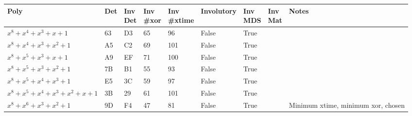 \begin{footnotesize}
\begin{longtable}{|l|l|l|l|l|l|l|l|l|}
\hline
\textbf{Poly}                           & \textbf{Det} & \shortstack{\textbf{Inv} \\ \textbf{Det}} & \shortstack{\textbf{Inv} \\ \textbf{\#xor}} & \shortstack{\textbf{Inv} \\ \textbf{\#xtime}} & \textbf{Involutory} & \shortstack{\textbf{Inv} \\ \textbf{MDS}} & \shortstack{\textbf{Inv} \\ \textbf{Mat}} & \textbf{Notes} \\ \hline
\endfirsthead
%
\endhead
%
$x^8 + x^4 + x^3 + x + 1$               & 63            & D3                & 65                  & 96                    & False               & True              &              &                                    \\ \hline
$x^8 + x^4 + x^3 + x^2 + 1$             & A5            & C2                & 69                  & 101                   & False               & True              &              &                                    \\ \hline
$x^8 + x^5 + x^3 + x + 1$               & A9            & EF                & 71                  & 100                   & False               & True              &              &                                    \\ \hline
$x^8 + x^5 + x^3 + x^2 + 1$             & 7B            & B1                & 55                  & 93                    & False               & True              &              &                                    \\ \hline
$x^8 + x^5 + x^4 + x^3 + 1$             & E5            & 3C                & 59                  & 97                    & False               & True              &              &                                    \\ \hline
$x^8 + x^5 + x^4 + x^3 + x^2 + x + 1$   & 3B            & 29                & 61                  & 101                   & False               & True              &              &                                    \\ \hline
$x^8 + x^6 + x^3 + x^2 + 1$             & 9D            & F4                & 47                  & 81                    & False               & True              &              & Minimum xtime, minimum xor, chosen \\ \hline

\end{longtable}
\end{footnotesize}
